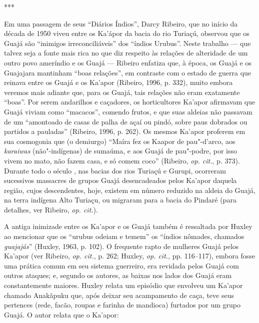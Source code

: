 \begin{samepage}
\begin{center}
***
\end{center}

Em uma passagem de seus ``Diários Índios'', Darcy Ribeiro, que no início
da década de 1950 viveu entre os Ka'ápor da bacia do rio Turiaçú,
observou que os Guajá são ``inimigos irreconciliáveis'' dos ``índios
Urubus''. Neste trabalho --- que talvez seja a fonte mais rica no que diz
respeito às relações de alteridade de um outro povo ameríndio e os Guajá
--- Ribeiro enfatiza que, à época, os Guajá e os Guajajara mantinham ``boas
relações'', em contraste com o estado de guerra que reinava entre os
Guajá e os Ka'apor (Ribeiro, 1996, p. 332), muito embora veremos mais
adiante que, para os Guajá, tais relações não eram exatamente ``boas''.
Por serem andarilhos e caçadores, os horticultores Ka'apor afirmavam que
Guajá viviam como ``macacos'', comendo frutos, e que suas aldeias não
passavam de um ``amontoado de casas de palha de açaí ou pindó, sobre
paus dobrados ou partidos a pauladas'' (Ribeiro, 1996, p. 262). Os mesmos
Ka'apor proferem em sua cosmogonia que (o demiurgo) ``Maíra fez os Kaapor
de pau"-d'arco, aos \emph{karaiwas} (não"-indígenas) de sumaúma, e aos
Guajá de pau"-podre, por isso vivem no mato, não fazem casa, e só comem
coco'' (Ribeiro, \emph{op. cit.}, p. 373). Durante todo o século , nas bacias
dos rios Turiaçú e Gurupi, ocorreram sucessivos massacres de grupos
Guajá desencadeados pelos Ka'apor daquela região, cujos descendentes,
hoje, existem em número reduzido na aldeia do  Guajá, na terra
indígena Alto Turiaçu, ou migraram para a bacia do Pindaré (para
detalhes, ver Ribeiro, \emph{op. cit.}).
\end{samepage}


A antiga inimizade entre os Ka'apor e os Guajá também é ressaltada por
Huxley ao mencionar que os ``urubus odeiam e temem'' os ``índios nômades,
chamados \emph{guajajás}'' (Huxley, 1963, p. 102). O frequente rapto de
mulheres Guajá pelos Ka'apor (ver Ribeiro, \emph{op. cit.}, p. 262; Huxley, \emph{op.
cit.}, pp. 116--117), embora fosse uma prática comum em seu sistema
guerreiro, era revidada pelos Guajá com outros ataques; e, segundo os
autores, as baixas nos lados dos Guajá eram constantemente maiores.
Huxley relata um episódio que envolveu um Ka'apor chamado Anakãpuku que,
após deixar seu acampamento de caça, teve seus pertences (rede, facão,
roupas e farinha de mandioca) furtados por um grupo Guajá. O autor
relata que o Ka'apor:

